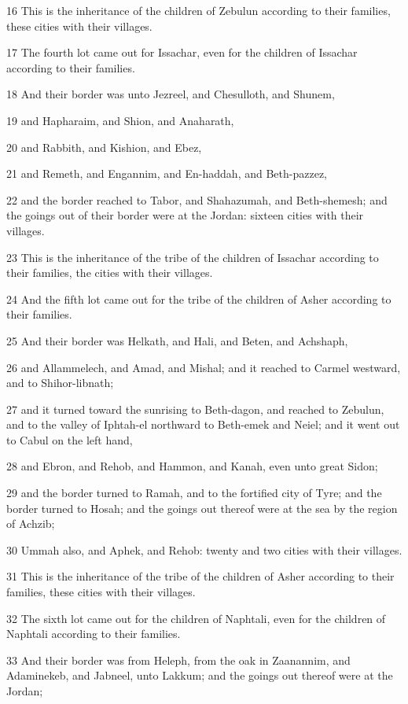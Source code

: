 \par 16 This is the inheritance of the children of Zebulun according to their families, these cities with their villages.
\par 17 The fourth lot came out for Issachar, even for the children of Issachar according to their families.
\par 18 And their border was unto Jezreel, and Chesulloth, and Shunem,
\par 19 and Hapharaim, and Shion, and Anaharath,
\par 20 and Rabbith, and Kishion, and Ebez,
\par 21 and Remeth, and Engannim, and En-haddah, and Beth-pazzez,
\par 22 and the border reached to Tabor, and Shahazumah, and Beth-shemesh; and the goings out of their border were at the Jordan: sixteen cities with their villages.
\par 23 This is the inheritance of the tribe of the children of Issachar according to their families, the cities with their villages.
\par 24 And the fifth lot came out for the tribe of the children of Asher according to their families.
\par 25 And their border was Helkath, and Hali, and Beten, and Achshaph,
\par 26 and Allammelech, and Amad, and Mishal; and it reached to Carmel westward, and to Shihor-libnath;
\par 27 and it turned toward the sunrising to Beth-dagon, and reached to Zebulun, and to the valley of Iphtah-el northward to Beth-emek and Neiel; and it went out to Cabul on the left hand,
\par 28 and Ebron, and Rehob, and Hammon, and Kanah, even unto great Sidon;
\par 29 and the border turned to Ramah, and to the fortified city of Tyre; and the border turned to Hosah; and the goings out thereof were at the sea by the region of Achzib;
\par 30 Ummah also, and Aphek, and Rehob: twenty and two cities with their villages.
\par 31 This is the inheritance of the tribe of the children of Asher according to their families, these cities with their villages.
\par 32 The sixth lot came out for the children of Naphtali, even for the children of Naphtali according to their families.
\par 33 And their border was from Heleph, from the oak in Zaanannim, and Adaminekeb, and Jabneel, unto Lakkum; and the goings out thereof were at the Jordan;
